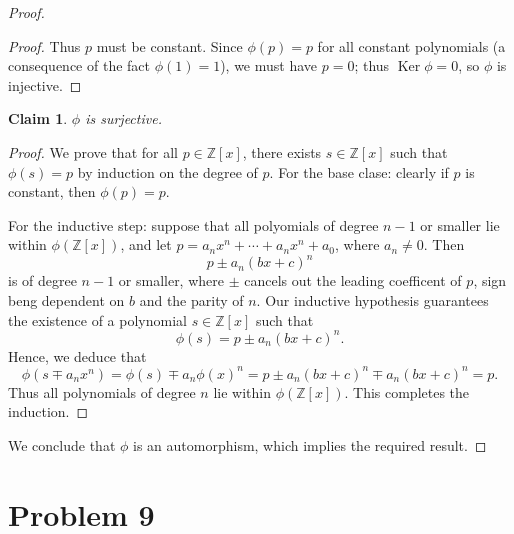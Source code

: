 \documentclass[11pt]{article}
\newtheorem{claim}{Claim}
\newcommand{\Ker}{\operatorname{Ker}}
\begin{document}
\begin{proof}
\begin{adjustwidth}{1cm}{}
\begin{proof}
      Thus $p$ must be constant. Since $\phi(p) = p$ for all constant polynomials (a consequence of the fact $\phi(1) = 1$), we must have $p = 0$; thus $\Ker \phi = 0$, so $\phi$ is injective.
    \end{proof}
  \end{adjustwidth}

  \begin{adjustwidth}{1cm}{}
    \begin{claim}
      $\phi$ is surjective.
    \end{claim}
    \begin{proof}\renewcommand{\qedsymbol}{}
      We prove that for all $p \in \mathbb{Z}[x]$, there exists $s \in \mathbb{Z}[x]$ such that $\phi(s) = p$ by induction on the degree of $p$. For the base clase: clearly if $p$ is constant, then $\phi(p) = p$.
  
      For the inductive step: suppose that all polyomials of degree $n - 1$ or smaller lie within $\phi(\mathbb{Z}[x])$, and let $p = a_{n}x^{n} + \cdots + a_{n}x^{n} + a_{0}$, where $a_{n} \ne 0$. Then
      \[
        p \pm a_{n} (bx + c)^{n}
      \]
      is of degree $n - 1$ or smaller, where $\pm$ cancels out the leading coefficent of $p$, sign beng dependent on $b$ and the parity of $n$. Our inductive hypothesis guarantees the existence of a polynomial $s \in \mathbb{Z}[x]$ such that
      \[
        \phi(s) = p \pm a_{n}(bx + c)^{n}.
      \]
      Hence, we deduce that 
      \[
        \phi(s \mp a_{n}x^{n}) = \phi(s) \mp a_{n} \phi(x)^{n} = p \pm a_{n}(bx + c)^{n} \mp a_{n}(bx + c)^{n} = p.
      \]
      Thus all polynomials of degree $n$ lie within $\phi(\mathbb{Z}[x])$. This completes the induction.
    \end{proof}
  \end{adjustwidth}

  We conclude that $\phi$ is an automorphism, which implies the required result.
\end{proof}

\newpage


\section{Problem 9}

\end{document}
